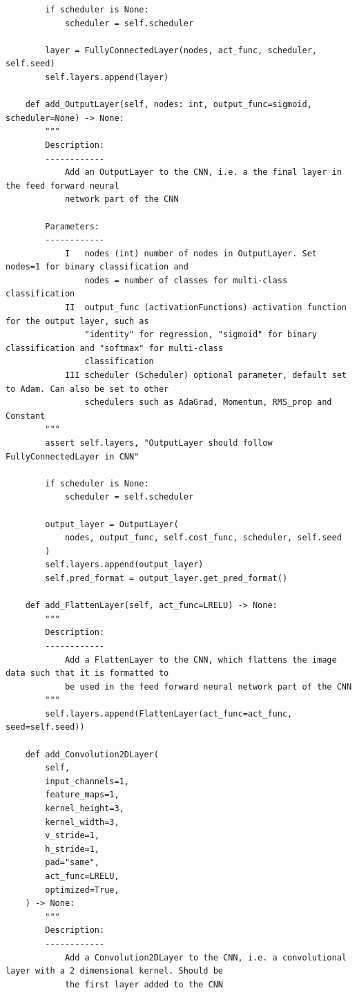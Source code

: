 \documentclass[%
oneside,                 %
final,                   %
10pt]{article}
\begin{document}
\begin{verbatim}
        if scheduler is None:
            scheduler = self.scheduler

        layer = FullyConnectedLayer(nodes, act_func, scheduler, self.seed)
        self.layers.append(layer)

    def add_OutputLayer(self, nodes: int, output_func=sigmoid, scheduler=None) -> None:
        """
        Description:
        ------------
            Add an OutputLayer to the CNN, i.e. a the final layer in the feed forward neural
            network part of the CNN

        Parameters:
        ------------
            I   nodes (int) number of nodes in OutputLayer. Set nodes=1 for binary classification and
                nodes = number of classes for multi-class classification
            II  output_func (activationFunctions) activation function for the output layer, such as
                "identity" for regression, "sigmoid" for binary classification and "softmax" for multi-class
                classification
            III scheduler (Scheduler) optional parameter, default set to Adam. Can also be set to other
                schedulers such as AdaGrad, Momentum, RMS_prop and Constant
        """
        assert self.layers, "OutputLayer should follow FullyConnectedLayer in CNN"

        if scheduler is None:
            scheduler = self.scheduler

        output_layer = OutputLayer(
            nodes, output_func, self.cost_func, scheduler, self.seed
        )
        self.layers.append(output_layer)
        self.pred_format = output_layer.get_pred_format()

    def add_FlattenLayer(self, act_func=LRELU) -> None:
        """
        Description:
        ------------
            Add a FlattenLayer to the CNN, which flattens the image data such that it is formatted to
            be used in the feed forward neural network part of the CNN
        """
        self.layers.append(FlattenLayer(act_func=act_func, seed=self.seed))

    def add_Convolution2DLayer(
        self,
        input_channels=1,
        feature_maps=1,
        kernel_height=3,
        kernel_width=3,
        v_stride=1,
        h_stride=1,
        pad="same",
        act_func=LRELU,
        optimized=True,
    ) -> None:
        """
        Description:
        ------------
            Add a Convolution2DLayer to the CNN, i.e. a convolutional layer with a 2 dimensional kernel. Should be
            the first layer added to the CNN


\end{verbatim}
\end{document}
